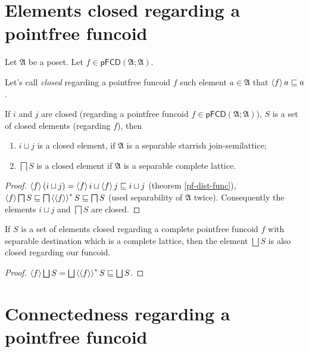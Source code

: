 \section{Elements closed regarding a pointfree funcoid}

Let $\mathfrak{A}$ be a poset. Let $f\in\mathsf{pFCD}(\mathfrak{A};\mathfrak{A})$.
\begin{defn}
Let's call \emph{closed}
regarding a pointfree funcoid $f$ such element $a\in\mathfrak{A}$
that $\left\langle f\right\rangle a\sqsubseteq a$.\end{defn}
\begin{prop}
If $i$ and $j$ are closed (regarding a pointfree funcoid $f\in\mathsf{pFCD}(\mathfrak{A};\mathfrak{A})$),
$S$ is a set of closed elements (regarding $f$), then
\begin{enumerate}
\item $i\sqcup j$ is a closed element, if $\mathfrak{A}$ is a separable
starrish join-semilattice;
\item $\bigsqcap S$ is a closed element if $\mathfrak{A}$ is a separable
complete lattice.
\end{enumerate}
\end{prop}
\begin{proof}
$\left\langle f\right\rangle(i\sqcup j)=\left\langle f\right\rangle i\sqcup\left\langle f\right\rangle j\sqsubseteq i\sqcup j$
(theorem \ref{pf-dist-func}), $\left\langle f\right\rangle\bigsqcap S\sqsubseteq\bigsqcap\left\langle \left\langle f\right\rangle\right\rangle ^{\ast}S\sqsubseteq\bigsqcap S$
(used separability of $\mathfrak{A}$ twice). Consequently the elements
$i\sqcup j$ and $\bigsqcap S$ are closed.\end{proof}
\begin{prop}
If $S$ is a set of elements closed regarding a complete pointfree
funcoid $f$ with separable destination which is a complete lattice,
then the element $\bigsqcup S$ is also closed regarding our funcoid.\end{prop}
\begin{proof}
$\left\langle f\right\rangle\bigsqcup S=\bigsqcup\left\langle \left\langle f\right\rangle\right\rangle ^{\ast}S\sqsubseteq\bigsqcup S$.
\end{proof}

\section{Connectedness regarding a pointfree funcoid}

